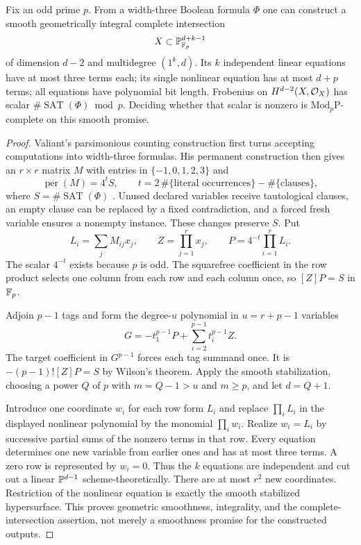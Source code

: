 \begin{theorem}
\label{sp:thm:odd-linears}
Fix an odd prime $p$. From a width-three Boolean formula $\Phi$ one
can construct a smooth geometrically integral complete intersection
\[
 X\subset\mathbb P^{d+k-1}_{\mathbb F_p}
\]
of dimension $d-2$ and multidegree $(1^k,d)$. Its $k$ independent
linear equations have at most three terms each; its single nonlinear
equation has at most $d+p$ terms; all equations have polynomial bit
length. Frobenius on $H^{d-2}(X,\mathcal O_X)$ has scalar
$\#\operatorname{SAT}(\Phi)\bmod p$. Deciding whether that scalar is
nonzero is $\mathrm{Mod}_p\mathrm P$-complete on this smooth promise.
\end{theorem}
\begin{proof}
Valiant's parsimonious counting construction first turns accepting
computations into width-three formulas. His permanent construction
then gives an $r\times r$ matrix $M$ with entries in
$\{-1,0,1,2,3\}$ and
\[
 \operatorname{per}(M)=4^t S,\qquad
 t=2\,\#\{\text{literal occurrences}\}
      -\#\{\text{clauses}\},
\]
where $S=\#\operatorname{SAT}(\Phi)$
\citep[Lemmas~3.1--3.2, p.~193]{sp-valiant}.
Unused declared variables receive tautological clauses, an empty clause
can be replaced by a fixed contradiction, and a forced fresh variable
ensures a nonempty instance. These changes preserve $S$.
Put
\[
 L_i=\sum_jM_{ij}x_j,\qquad Z=\prod_{j=1}^r x_j,
 \qquad P=4^{-t}\prod_{i=1}^rL_i.
\]
The scalar $4^{-t}$ exists because $p$ is odd. The squarefree coefficient
in the row product selects one column from each row and each column
once, so $[Z]P=S$ in $\mathbb F_p$.

Adjoin $p-1$ tags and form the degree-$u$ polynomial in $u=r+p-1$
variables
\[
 G=-t_1^{p-1}P+\sum_{i=2}^{p-1}t_i^{p-1}Z.
\]
The target coefficient in $G^{p-1}$ forces each tag summand once.
It is $-(p-1)![Z]P=S$ by Wilson's theorem. Apply the smooth
stabilization, choosing a power $Q$ of $p$ with $m=Q-1>u$ and
$m\geq p$, and let $d=Q+1$.

Introduce one coordinate $w_i$ for each row form $L_i$ and replace
$\prod_i L_i$ in the displayed nonlinear polynomial by the monomial
$\prod_i w_i$. Realize $w_i=L_i$ by successive partial sums of the
nonzero terms in that row. Every equation determines one new variable
from earlier ones and has at most three terms. A zero row is represented
by $w_i=0$. Thus the $k$ equations are independent and cut out a linear
$\mathbb P^{d-1}$ scheme-theoretically. There are at most $r^2$ new coordinates.
Restriction of the nonlinear equation is exactly the smooth stabilized
hypersurface. This proves geometric smoothness, integrality, and the
complete-intersection assertion, not merely a smoothness promise for
the constructed outputs.


\end{proof}
